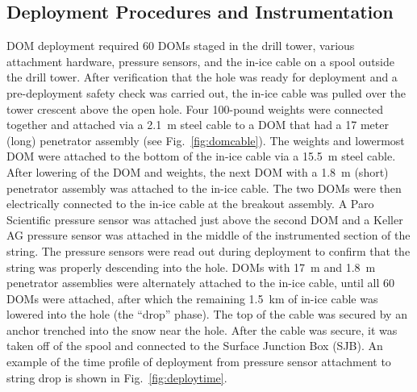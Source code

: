 
\subsection{\label{sec:deployment_inst}Deployment Procedures and Instrumentation}

DOM deployment required 60 DOMs staged in the drill tower, various
attachment hardware, pressure sensors, and the in-ice cable on a spool
outside the drill tower. After verification that the hole was 
ready for deployment and a pre-deployment safety check was carried out, the in-ice cable
was pulled over the tower crescent above the open hole. Four 100-pound
weights were connected together and attached via a 2.1~m steel cable to a
DOM that had a 17 meter (long) penetrator assembly (see Fig.~\ref{fig:domcable}). The weights and
lowermost DOM were attached to the bottom of the in-ice cable via a 15.5~m
steel cable. After lowering of the DOM and weights, the next DOM with a
1.8~m (short) penetrator assembly was attached to the in-ice cable. The two DOMs were
then electrically connected to the in-ice cable at the breakout assembly. A
Paro Scientific pressure sensor was attached just above the second DOM
and a Keller AG pressure sensor was attached in the middle of the
instrumented section of the string. The
pressure sensors were read out during deployment to confirm that the string
was properly descending into the hole.   DOMs with 17~m and
1.8~m penetrator assemblies were alternately attached to the in-ice 
cable, until all 60 DOMs were attached, after which the remaining 1.5~km of
in-ice cable was lowered into the hole (the ``drop'' phase). The top of the
cable was secured by an anchor trenched into the snow near the hole. After the
cable was secure, it was taken off of the spool and connected to the
Surface Junction Box (SJB). An example of the time profile of deployment from pressure sensor
attachment to string drop is shown in Fig.~\ref{fig:deploytime}.

